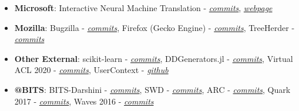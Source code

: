 
\begin{courses}
	\course
	{\begin{itemize}
	
	\item \textbf{Microsoft}: Interactive Neural Machine Translation -  \href{https://github.com/microsoft/inmt/commits?author=SebastinSanty}{\textit{commits}}, \href{https://microsoft.github.io/inmt/}{\textit{webpage}}
	
    \item \textbf{Mozilla}: Bugzilla - \href{https://github.com/mozilla-bteam/bmo/commits?author=sebastinsanty}{\textit{commits}}, Firefox (Gecko Engine) -  \href{https://github.com/mozilla/gecko-dev/commits?author=sebastinssanty}{\textit{commits}}, TreeHerder - \href{https://github.com/mozilla/treeherder/commits?author=sebastinsanty}{\textit{commits}}
    
    \item \textbf{Other External}: scikit-learn - \href{https://github.com/scikit-learn/scikit-learn/commits?author=sebastinsanty}{\textit{commits}}, DDGenerators.jl -  \href{https://github.com/oxinabox/DataDepsGenerators.jl/commits?author=sebastinsanty}{\textit{commits}}, Virtual ACL 2020 - \href{https://github.com/acl-org/acl-2020-virtual-conference/commits?author=sebastinsanty}{\textit{commits}}, UserContext - \href{https://github.com/usercontext}{\textit{github}}
    
    \item \textbf{@BITS}: BITS-Darshini - \href{https://github.com/prasadtalasila/BITS-Darshini/commits?author=sebastinsanty}{\textit{commits}}, SWD - \href{https://github.com/swd-bits-goa/swd_django/commits?author=sebastinsanty}{\textit{commits}}, ARC - \href{https://github.com/arc-bits-goa/portal/commits?author=SebastinSanty}{\textit{commits}}, Quark 2017 - \href{ https://github.com/OSDLabs/QuarkWebsite2017/commits?author=SebastinSanty}{\textit{commits}}, Waves 2016 - \href{https://github.com/OSDLabs/WavesWebsite2016/commits?author=SebastinSanty}{\textit{commits}}
    
     \end{itemize}} \\
\end{courses}
\vspace{-3mm}